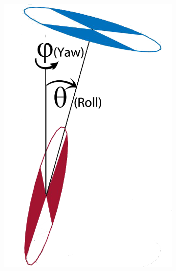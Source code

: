 \documentclass[twoside,twocolumn,12pt]{article}
\begin{document}
\begin{figure}[h]
  \centering
  \begin{subfigure}[t]{0.1935\textwidth}
    \includegraphics[width=\linewidth]{end_labled2}
  \label{fig:e}
  \end{subfigure}
  \begin{subfigure}[t]{0.2295\textwidth}

\end{subfigure}
\end{figure}
\end{document}
